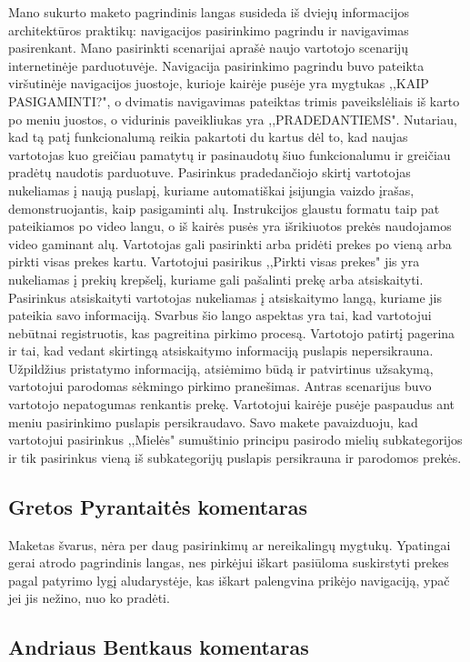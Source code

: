 \documentclass[oneside]{VUMIFPSkursinis}
\begin{document}
Mano sukurto maketo pagrindinis langas susideda iš dviejų informacijos architektūros praktikų: navigacijos pasirinkimo pagrindu ir navigavimas pasirenkant. 
Mano pasirinkti scenarijai aprašė naujo vartotojo scenarijų internetinėje parduotuvėje. 
Navigacija pasirinkimo pagrindu buvo pateikta viršutinėje navigacijos juostoje, kurioje kairėje pusėje yra mygtukas ,,KAIP PASIGAMINTI?", o dvimatis navigavimas pateiktas trimis paveikslėliais iš karto po meniu juostos, o vidurinis paveikliukas yra ,,PRADEDANTIEMS". 
Nutariau, kad tą patį funkcionalumą reikia pakartoti du kartus dėl to, kad naujas vartotojas kuo greičiau pamatytų ir pasinaudotų šiuo funkcionalumu ir greičiau pradėtų naudotis parduotuve. 
Pasirinkus pradedančiojo skirtį vartotojas nukeliamas į naują puslapį, kuriame automatiškai įsijungia vaizdo įrašas, demonstruojantis, kaip pasigaminti alų. 
Instrukcijos glaustu formatu taip pat pateikiamos po video langu, o iš kairės pusės yra išrikiuotos prekės naudojamos video gaminant alų.
Vartotojas gali pasirinkti arba pridėti prekes po vieną arba pirkti visas prekes kartu. 
Vartotojui pasirikus ,,Pirkti visas prekes" jis yra nukeliamas į prekių krepšelį, kuriame gali pašalinti prekę arba atsiskaityti. 
Pasirinkus atsiskaityti vartotojas nukeliamas į atsiskaitymo langą, kuriame jis pateikia savo informaciją. 
Svarbus šio lango aspektas yra tai, kad vartotojui nebūtnai registruotis, kas pagreitina pirkimo procesą. 
Vartotojo patirtį pagerina ir tai, kad vedant skirtingą atsiskaitymo informaciją puslapis nepersikrauna.
 Užpildžius pristatymo informaciją, atsiėmimo būdą ir patvirtinus užsakymą, vartotojui parodomas sėkmingo pirkimo pranešimas. \newline
Antras scenarijus buvo vartotojo nepatogumas renkantis prekę.
Vartotojui kairėje pusėje paspaudus ant meniu pasirinkimo puslapis persikraudavo.
Savo makete pavaizduoju, kad vartotojui pasirinkus ,,Mielės" sumuštinio principu pasirodo mielių subkategorijos ir tik pasirinkus vieną iš subkategorijų puslapis persikrauna ir parodomos prekės.
	\subsection{Gretos Pyrantaitės komentaras}
	Maketas švarus, nėra per daug pasirinkimų ar nereikalingų mygtukų. Ypatingai gerai atrodo pagrindinis langas, nes pirkėjui iškart pasiūloma suskirstyti prekes pagal patyrimo lygį aludarystėje, kas iškart palengvina prikėjo navigaciją, ypač jei jis nežino, nuo ko pradėti.
	\subsection{Andriaus Bentkaus komentaras}
\end{document}
